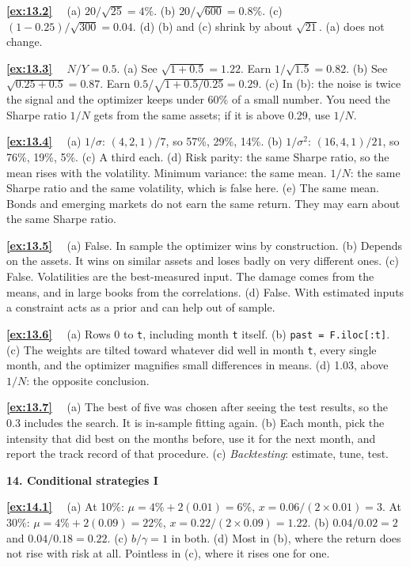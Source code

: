 \documentclass[11pt]{article}
\newcounter{ex}[section]
\newcommand{\sol}[1]{\par\smallskip\textbf{\ref{#1}}\ \ }
\newcommand{\head}[1]{\par\medskip\textbf{#1}\par}
\begin{document}
{\sol{ex:13.2} (a) $20/\sqrt{25} = 4\%$. (b) $20/\sqrt{600} = 0.8\%$. (c) $(1 - 0.25)/\sqrt{300} = 0.04$. (d) (b) and (c) shrink
by about $\sqrt{21}$. (a) does not change.

\sol{ex:13.3} $N/Y = 0.5$. (a) See $\sqrt{1 + 0.5} = 1.22$. Earn $1/\sqrt{1.5} = 0.82$. (b) See $\sqrt{0.25 + 0.5} = 0.87$.
Earn $0.5/\sqrt{1 + 0.5/0.25} = 0.29$. (c) In (b): the noise is twice the signal and the optimizer keeps under 60\% of a
small number. You need the Sharpe ratio $1/N$ gets from the same assets; if it is above 0.29, use $1/N$.

\sol{ex:13.4} (a) $1/\sigma$: $(4, 2, 1)/7$, so 57\%, 29\%, 14\%. (b) $1/\sigma^{2}$: $(16, 4, 1)/21$, so 76\%, 19\%, 5\%.
(c) A third each. (d) Risk parity: the same Sharpe ratio, so the mean rises with the volatility. Minimum variance: the
same mean. $1/N$: the same Sharpe ratio and the same volatility, which is false here. (e) The same mean. Bonds and
emerging markets do not earn the same return. They may earn about the same Sharpe ratio.

\sol{ex:13.5} (a) False. In sample the optimizer wins by construction. (b) Depends on the assets. It wins on similar
assets and loses badly on very different ones. (c) False. Volatilities are the best-measured input. The damage comes
from the means, and in large books from the correlations. (d) False. With estimated inputs a constraint acts as a
prior and can help out of sample.

\sol{ex:13.6} (a) Rows 0 to \texttt{t}, including month \texttt{t} itself. (b) \texttt{past = F.iloc[:t]}. (c) The weights
are tilted toward whatever did well in month \texttt{t}, every single month, and the optimizer magnifies small
differences in means. (d) 1.03, above $1/N$: the opposite conclusion.

\sol{ex:13.7} (a) The best of five was chosen after seeing the test results, so the 0.3 includes the search. It is
in-sample fitting again. (b) Each month, pick the intensity that did best on the months before, use it for the next
month, and report the track record of that procedure. (c) \emph{Backtesting}: estimate, tune, test.

\head{14. Conditional strategies I}

\sol{ex:14.1} (a) At 10\%: $\mu = 4\% + 2(0.01) = 6\%$, $x = 0.06/(2\times 0.01) = 3$. At 30\%: $\mu = 4\% + 2(0.09) = 22\%$,
$x = 0.22/(2\times 0.09) = 1.22$. (b) $0.04/0.02 = 2$ and $0.04/0.18 = 0.22$. (c) $b/\gamma = 1$ in both. (d) Most in (b),
where the return does not rise with risk at all. Pointless in (c), where it rises one for one.

}
\end{document}
